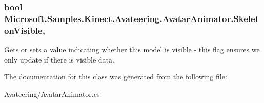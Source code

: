 \hypertarget{class_microsoft_1_1_samples_1_1_kinect_1_1_avateering_1_1_avatar_animator_a3185fd0fe9fd0db6d0ac75083a490c4c}{
\subsubsection[{Skeleton\+Visible}]{\setlength{\rightskip}{0pt plus 5cm}bool Microsoft.\+Samples.\+Kinect.\+Avateering.\+Avatar\+Animator.\+Skeleton\+Visible\hspace{0.3cm}{\ttfamily [get]}, {\ttfamily [set]}}}\label{class_microsoft_1_1_samples_1_1_kinect_1_1_avateering_1_1_avatar_animator_a3185fd0fe9fd0db6d0ac75083a490c4c}


Gets or sets a value indicating whether this model is visible -\/ this flag ensures we only update if there is visible data. 



The documentation for this class was generated from the following file\+:\begin{DoxyCompactItemize}
\item 
Avateering/Avatar\+Animator.\+cs\end{DoxyCompactItemize}

